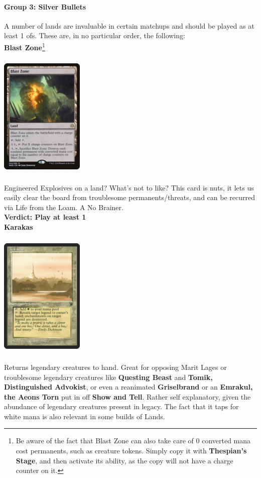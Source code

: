 \documentclass{report}
\begin{document}
\paragraph{Group 3: Silver Bullets\\}
A number of lands are invaluable in certain matchups and should be played as at least 1 ofs. These are, in no particular order, the following:\\
\newpage
\textbf{Blast Zone}\footnote{Be aware of the fact that Blast Zone can also take care of 0 converted mana cost permanents, such as creature tokens. Simply copy it with \textbf{Thespian's Stage}, and then activate its ability, as the copy will not have a charge counter on it.}
\begin{center}
\includegraphics [width = 4cm, height = 6cm] {blast-zone}
\end{center}
Engineered Explosives on a land? What's not to like? This card is nuts, it lets us easily clear the board from troublesome permanents/threats, and can be recurred via Life from the Loam. A No Brainer.\\\textbf{Verdict: Play at least 1}
\textbf{\\Karakas}
\begin{center}
\includegraphics [width = 4cm, height = 6cm] {karakas}
\end{center} Returns legendary creatures to hand. Great for opposing Marit Lages or troublesome legendary creatures like \textbf{Questing Beast} and \textbf{Tomik, Distinguished Advokist}, or even a reanimated \textbf{Griselbrand} or an \textbf{Emrakul, the Aeons Torn} put in off \textbf{Show and Tell}. Rather self explanatory, given the abundance of legendary creatures present in legacy. The fact that it taps for white mana is also relevant in some builds of Lands.
\end{document}
